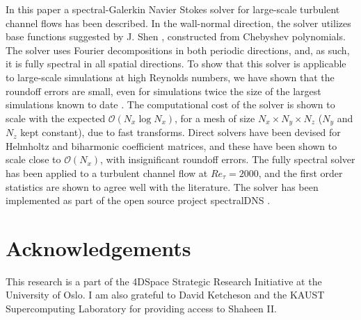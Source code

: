\documentclass[preprint]{elsarticle}
\begin{document}
In this paper a spectral-Galerkin Navier Stokes solver for large-scale turbulent channel flows 
has been described. In the wall-normal direction, the solver utilizes base 
functions 
suggested by J. Shen \cite{Shen95}, constructed from Chebyshev polynomials. The 
solver uses Fourier decompositions in both periodic directions, and, as such, 
it is fully spectral in all spatial directions. To show that this solver is 
applicable to large-scale simulations at high Reynolds numbers,  we have shown 
that the roundoff errors are small, even for simulations twice the size of the 
largest simulations known to date \cite{leemoser15}.
The computational cost of the solver is shown to scale with the expected 
$\mathcal{O}(N_x \log N_x)$, for a mesh of size $N_x \times N_y \times N_z$ ($N_y$ and $N_z$ kept constant), due to fast 
transforms. Direct 
solvers have been devised for Helmholtz and biharmonic coefficient matrices, 
and these have been shown to scale close to 
$\mathcal{O}(N_x)$, with insignificant roundoff errors. The fully spectral solver 
has been applied to a turbulent 
channel flow at $Re_{\tau}=2000$, and the first order statistics are shown to agree well with the literature. The solver has been implemented as part of the open source project spectralDNS \cite{spectralDNS}.

\section*{Acknowledgements}
This research is a part of the 4DSpace Strategic Research Initiative at the University of Oslo. I am also grateful to David Ketcheson and the KAUST Supercomputing Laboratory for providing access to Shaheen II.
\end{document}
